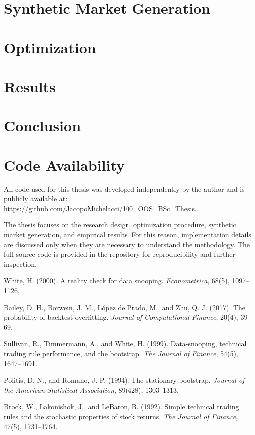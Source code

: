 \documentclass[12pt,a4paper]{report}
\begin{document}
\chapter{Synthetic Market Generation}


\chapter{Optimization}


\chapter{Results}


\chapter{Conclusion}


\chapter*{Code Availability}

All code used for this thesis was developed independently by the author and is publicly available at:
\url{https://github.com/JacopoMichelacci/100_OOS_BSc_Thesis}.

The thesis focuses on the research design, optimization procedure, synthetic market generation, and
empirical results. For this reason, implementation details are discussed only when they are necessary
to understand the methodology. The full source code is provided in the repository for reproducibility
and further inspection.

\begin{thebibliography}{}

White, H. (2000).
A reality check for data snooping.
\textit{Econometrica}, 68(5), 1097--1126.

Bailey, D. H., Borwein, J. M., L\'opez de Prado, M., and Zhu, Q. J. (2017).
The probability of backtest overfitting.
\textit{Journal of Computational Finance}, 20(4), 39--69.

Sullivan, R., Timmermann, A., and White, H. (1999).
Data-snooping, technical trading rule performance, and the bootstrap.
\textit{The Journal of Finance}, 54(5), 1647--1691.

Politis, D. N., and Romano, J. P. (1994).
The stationary bootstrap.
\textit{Journal of the American Statistical Association}, 89(428), 1303--1313.

Brock, W., Lakonishok, J., and LeBaron, B. (1992).
Simple technical trading rules and the stochastic properties of stock returns.
\textit{The Journal of Finance}, 47(5), 1731--1764.

\end{thebibliography}
\end{document}
